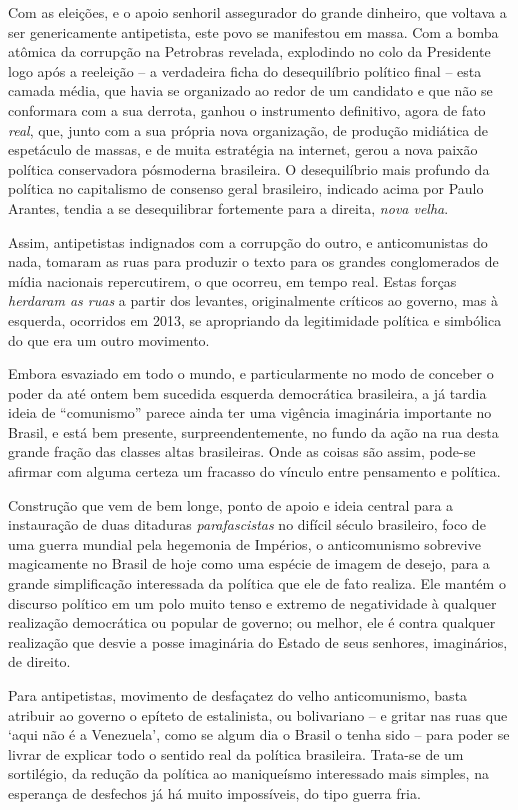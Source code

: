 Com as eleições, e o apoio senhoril assegurador do grande dinheiro, que
voltava a ser genericamente antipetista, este povo se manifestou em
massa. Com a bomba atômica da corrupção na Petrobras revelada,
explodindo no colo da Presidente logo após a reeleição -- a verdadeira
ficha do desequilíbrio político final -- esta camada média, que havia se
organizado ao redor de um candidato e que não se conformara com a sua
derrota, ganhou o instrumento definitivo, agora de fato \emph{real},
que, junto com a sua própria nova organização, de produção midiática de
espetáculo de massas, e de muita estratégia na internet, gerou a nova
paixão política conservadora pósmoderna brasileira. O desequilíbrio mais
profundo da política no capitalismo de consenso geral brasileiro,
indicado acima por Paulo Arantes, tendia a se desequilibrar fortemente
para a direita, \emph{nova velha}.

Assim, antipetistas indignados com a corrupção do outro, e
anticomunistas do nada, tomaram as ruas para produzir o texto para os
grandes conglomerados de mídia nacionais repercutirem, o que ocorreu, em
tempo real. Estas forças \emph{herdaram as ruas} a partir dos levantes,
originalmente críticos ao governo, mas à esquerda, ocorridos em 2013, se
apropriando da legitimidade política e simbólica do que era um outro
movimento.

Embora esvaziado em todo o mundo, e particularmente no modo de conceber
o poder da até ontem bem sucedida esquerda democrática brasileira, a já
tardia ideia de ``comunismo'' parece ainda ter uma vigência imaginária
importante no Brasil, e está bem presente, surpreendentemente, no fundo
da ação na rua desta grande fração das classes altas brasileiras. Onde
as coisas são assim, pode-se afirmar com alguma certeza um fracasso
do vínculo entre pensamento e política.

Construção que vem de bem longe, ponto de apoio e ideia central para a
instauração de duas ditaduras \emph{parafascistas} no difícil século 
brasileiro, foco de uma guerra mundial pela hegemonia de Impérios, o
anticomunismo sobrevive magicamente no Brasil de hoje como uma espécie
de imagem de desejo, para a grande simplificação interessada da política
que ele de fato realiza. Ele mantém o discurso político em um polo muito
tenso e extremo de negatividade à qualquer realização democrática ou
popular de governo; ou melhor, ele é contra qualquer realização que
desvie a posse imaginária do Estado de seus senhores, imaginários, de
direito.

Para antipetistas, movimento de desfaçatez do velho anticomunismo, basta
atribuir ao governo o epíteto de estalinista, ou bolivariano -- e gritar
nas ruas que `aqui não é a Venezuela', como se algum dia o Brasil o
tenha sido -- para poder se livrar de explicar todo o sentido real da
política brasileira. Trata-se de um sortilégio, da redução da política
ao maniqueísmo interessado mais simples, na esperança de desfechos já há
muito impossíveis, do tipo guerra fria.

